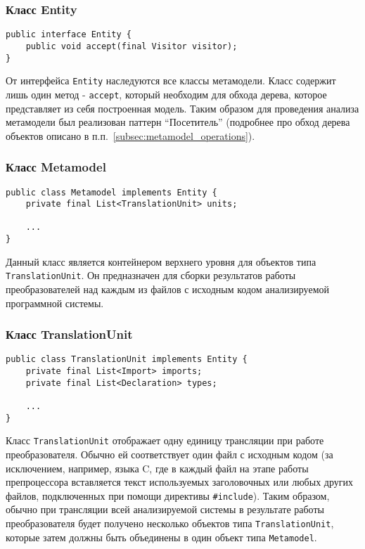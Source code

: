 \subsubsection{Класс Entity}

\begin{lstlisting}[caption={Интерфейс Entity}]
public interface Entity {
    public void accept(final Visitor visitor);
}
\end{lstlisting}

От интерфейса \texttt{Entity} наследуются все классы метамодели. Класс содержит
лишь один метод - \texttt{accept}, который необходим для обхода дерева, которое
представляет из себя построенная модель. Таким образом для проведения анализа
метамодели был реализован паттерн ``Посетитель'' (подробнее про обход
дерева объектов описано в п.п.~\ref{subsec:metamodel_operations}).

\vspace{10pt}
\subsubsection{Класс Metamodel}

\begin{lstlisting}[caption={Класс Metamodel}]
public class Metamodel implements Entity {
    private final List<TranslationUnit> units;

    ...
}
\end{lstlisting}

Данный класс является контейнером верхнего уровня для объектов типа
\texttt{TranslationUnit}. Он предназначен для сборки результатов работы
преобразователей над каждым из файлов с исходным кодом анализируемой программной
системы.

\vspace{10pt}
\subsubsection{Класс TranslationUnit}

\begin{lstlisting}[caption={Класс TranslationUnit}]
public class TranslationUnit implements Entity {
    private final List<Import> imports;
    private final List<Declaration> types;

    ...
}
\end{lstlisting}

Класс \texttt{TranslationUnit} отображает одну единицу трансляции при работе
преобразователя. Обычно ей соответствует один файл с исходным кодом (за
исключением, например, языка C, где в каждый файл на этапе работы препроцессора
вставляется текст используемых заголовочных или любых других файлов,
подключенных при помощи директивы \texttt{\#include}). Таким образом, обычно при
трансляции всей анализируемой системы в результате работы преобразователя
будет получено несколько объектов типа \texttt{TranslationUnit}, которые затем
должны быть объединены в один объект типа \texttt{Metamodel}.

